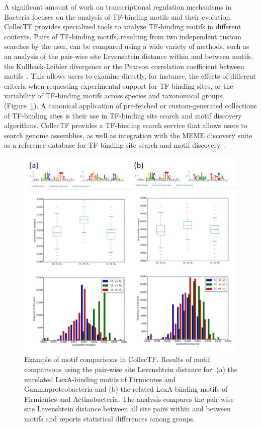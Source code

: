 A significant amount of work on transcriptional regulation mechanisms in
Bacteria focuses on the analysis of TF-binding motifs and their
evolution. CollecTF provides specialized tools to analyze TF-binding motifs in
different contexts. Pairs of TF-binding motifs, resulting from two independent
custom searches by the user, can be compared using a wide variety of methods,
such as an analysis of the pair-wise site Levenshtein distance within and
between motifs, the Kullback-Leibler divergence or the Pearson correlation
coefficient between motifs~\citep{vanet1999promoter, mahony2007stamp}. This
allows users to examine directly, for instance, the effects of different
criteria when requesting experimental support for TF-binding sites, or the
variability of TF-binding motifs across species and taxonomical groups
(Figure~\ref{fig:motif-comparison}). A canonical application of pre-fetched or
custom-generated collections of TF-binding sites is their use in TF-binding
site search and motif discovery algorithms. CollecTF provides a TF-binding
search service that allows users to search genome assemblies, as well as
integration with the MEME discovery suite as a reference database for
TF-binding site search and motif discovery~\citep{bailey2006meme}.

\begin{figure}
  \centering
  \includegraphics[width=\textwidth]{figures/chapter2/motif-comparison}
  \caption[Example of motif comparisons in CollecTF.]{Example of motif
    comparisons in CollecTF\@. Results of motif comparisons using the pair-wise
    site Levenshtein distance for: (a) the unrelated LexA-binding motifs of
    Firmicutes and Gammaproteobacteria and (b) the related LexA-binding motifs
    of Firmicutes and Actinobacteria. The analysis compares the pair-wise site
    Levenshtein distance between all site pairs within and between motifs and
    reports statistical differences among groups.}
\label{fig:motif-comparison}
\end{figure}

